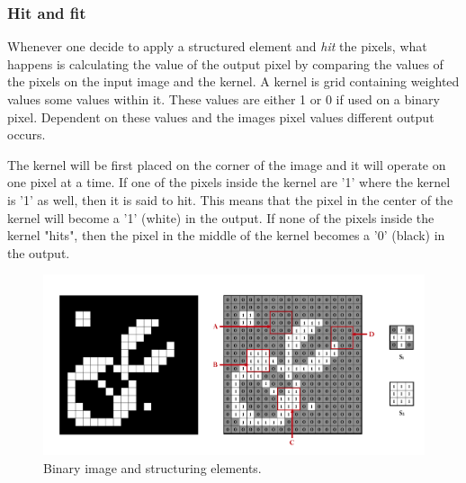 \subsubsection{Hit and fit}
Whenever one decide to apply a structured element and \textit{hit} the pixels, what happens is calculating the value of the output pixel by comparing the values of the pixels on the input image and the kernel. A kernel is grid containing weighted values some values within it. These values are either 1 or 0 if used on a binary pixel. Dependent on these values and the images pixel values different output occurs.

The kernel will be first placed on the corner of the image and it will operate on one pixel at a time. If one of the pixels inside the kernel are '1' where the kernel is '1' as well, then it is said to hit. This means that the pixel in the center of the kernel will become a '1' (white) in the output. If none of the pixels inside the kernel "hits", then the pixel in the middle of the kernel becomes a '0' (black) in the output.

\begin{figure}[htbp]
\centering
\includegraphics[width=1\textwidth]{Pictures/Theory/FitHitKernels.png}
\caption{Binary image and structuring elements.}
\label{fig:FitHit}
\end{figure}

